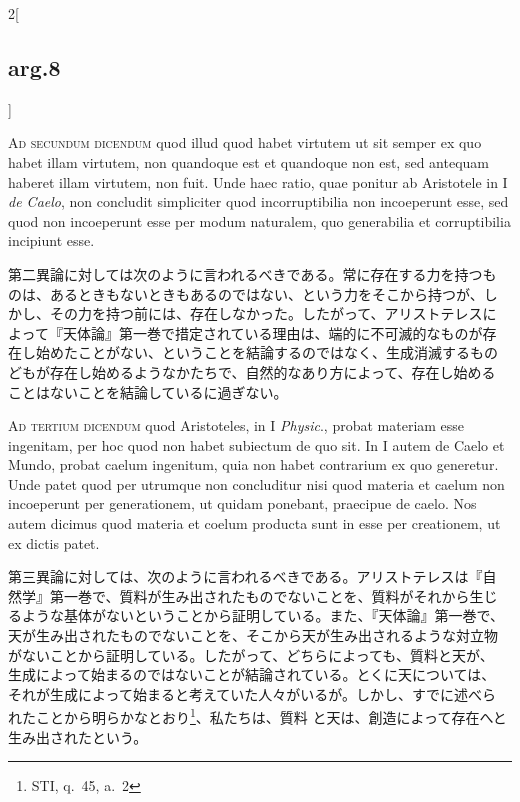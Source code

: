 \documentclass[paper=a4paper,fontsize=10pt,jafontsize=9pt,titlepage]{jlreq}
\begin{document}
\begin{paracol}{2}[\subsection{arg.8}]
\switchcolumn*[\subsection{ad.2}]


{\scshape Ad secundum dicendum} quod illud quod habet virtutem ut sit semper ex quo
 habet illam virtutem, non quandoque est et quandoque non est, sed
 antequam haberet illam virtutem, non fuit. Unde haec ratio, quae
 ponitur ab Aristotele in I {\itshape de Caelo}, non concludit simpliciter quod
 incorruptibilia non incoeperunt esse, sed quod non incoeperunt esse per
 modum naturalem, quo generabilia et corruptibilia incipiunt esse.


\switchcolumn


第二異論に対しては次のように言われるべきである。常に存在する力を持つも
のは、あるときもないときもあるのではない、という力をそこから持つが、し
かし、その力を持つ前には、存在しなかった。したがって、アリストテレスに
よって『天体論』第一巻で措定されている理由は、端的に不可滅的なものが存
在し始めたことがない、ということを結論するのではなく、生成消滅するもの
どもが存在し始めるようなかたちで、自然的なあり方によって、存在し始める
ことはないことを結論しているに過ぎない。


\switchcolumn*[\subsection{ad.3}]


{\scshape Ad tertium dicendum} quod Aristoteles, in I {\itshape Physic}., probat materiam esse
 ingenitam, per hoc quod non habet subiectum de quo sit. In I autem {de
 Caelo et Mundo}, probat caelum ingenitum, quia non habet contrarium ex
 quo generetur. Unde patet quod per utrumque non concluditur nisi quod
 materia et caelum non incoeperunt per generationem, ut quidam ponebant,
 praecipue de caelo. Nos autem dicimus quod materia et coelum producta
 sunt in esse per creationem, ut ex dictis patet.


\switchcolumn


第三異論に対しては、次のように言われるべきである。アリストテレスは『自
然学』第一巻で、質料が生み出されたものでないことを、質料がそれから生じ
るような基体がないということから証明している。また、『天体論』第一巻で、
天が生み出されたものでないことを、そこから天が生み出されるような対立物
がないことから証明している。したがって、どちらによっても、質料と天が、
生成によって始まるのではないことが結論されている。とくに天については、
それが生成によって始まると考えていた人々がいるが。しかし、すでに述べら
れたことから明らかなとおり\footnote{STI, q.~45, a.~2}、私たちは、質料
と天は、創造によって存在へと生み出されたという。



\end{paracol}
\end{document}
